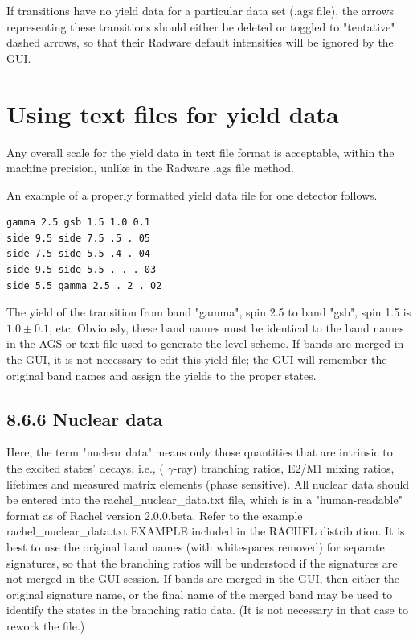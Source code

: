\documentclass[10pt]{article}
\begin{document}
If transitions have no yield data for a particular data set (.ags file), the arrows representing these transitions should either be deleted or toggled to "tentative" dashed arrows, so that their Radware default intensities will be ignored by the GUI.

\section*{Using text files for yield data}
Any overall scale for the yield data in text file format is acceptable, within the machine precision, unlike in the Radware .ags file method.

An example of a properly formatted yield data file for one detector follows.

\begin{verbatim}
gamma 2.5 gsb 1.5 1.0 0.1
side 9.5 side 7.5 .5 . 05
side 7.5 side 5.5 .4 . 04
side 9.5 side 5.5 . . . 03
side 5.5 gamma 2.5 . 2 . 02
\end{verbatim}

The yield of the transition from band "gamma", spin 2.5 to band "gsb", spin 1.5 is $1.0 \pm 0.1$, etc. Obviously, these band names must be identical to the band names in the AGS or text-file used to generate the level scheme. If bands are merged in the GUI, it is not necessary to edit this yield file; the GUI will remember the original band names and assign the yields to the proper states.

\subsection*{8.6.6 Nuclear data}
Here, the term "nuclear data" means only those quantities that are intrinsic to the excited states' decays, i.e., ( $\gamma$-ray) branching ratios, E2/M1 mixing ratios, lifetimes and measured matrix elements (phase sensitive). All nuclear data should be entered into the rachel\_nuclear\_data.txt file, which is in a "human-readable" format as of Rachel version 2.0.0.beta. Refer to the example rachel\_nuclear\_data.txt.EXAMPLE included in the RACHEL distribution. It is best to use the original band names (with whitespaces removed) for separate signatures, so that the branching ratios will be understood if the signatures are not merged in the GUI session. If bands are merged in the GUI, then either the original signature name, or the final name of the merged band may be used to identify the states in the branching ratio data. (It is not necessary in that case to rework the file.)
\end{document}
